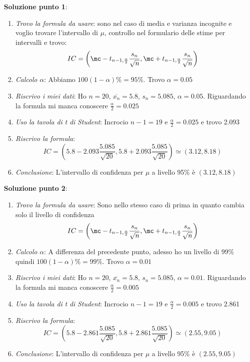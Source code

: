 \ind \textbf{Soluzione punto 1}: 
\begin{enumerate}
    \item \textit{Trovo la formula da usare}: sono nel caso di media e varianza incognite e voglio trovare l'intervallo di $\mu$, controllo nel formulario delle stime per intervalli e trovo: $$ IC = \left( \mc - t_{n-1,\frac{\alpha}{2}} \dfrac{s_n}{\sqrt{n}}, \mc + t_{n-1,\frac{\alpha}{2}} \dfrac{s_n}{\sqrt{n}}\right) $$
    \item \textit{Calcolo $\alpha$}: Abbiamo $100(1 - \alpha)\% = 95\%$. Trovo $\alpha=0.05$
    \item \textit{Riscrivo i miei dati}: Ho $n=20$, $\overline{x_n}=5.8$, $s_n=5.085$, $\alpha=0.05$. Riguardando la formula mi manca conoscere $\frac{\alpha}{2}=0.025$
    \item \textit{Uso la tavola di t di Student}: Incrocio $n-1=19$ e $\frac{\alpha}{2}=0.025$ e trovo 2.093
    \item \textit{Riscrivo la formula}: $$IC = \left( 5.8 - 2.093 \frac{5.085}{\sqrt{20}}, 5.8 + 2.093 \frac{5.085}{\sqrt{20}} \right) \simeq (3.12 , 8.18)$$
    \item \textit{Conclusione}: L'intervallo di confidenza per $\mu$ a livello 95\% è $(3.12 , 8.18)$ 
\end{enumerate}

\ind \textbf{Soluzione punto 2}: 
\begin{enumerate}
    \item \textit{Trovo la formula da usare}: Sono nello stesso caso di prima in quanto cambia solo il livello di confidenza $$ IC = \left( \mc - t_{n-1,\frac{\alpha}{2}} \dfrac{s_n}{\sqrt{n}}, \mc + t_{n-1,\frac{\alpha}{2}} \dfrac{s_n}{\sqrt{n}}\right) $$
    \item \textit{Calcolo $\alpha$}: A differenza del precedente punto, adesso ho un livello di 99\% quindi $100(1 - \alpha)\% = 99\%$. Trovo $\alpha=0.01$
    \item \textit{Riscrivo i miei dati}: Ho $n=20$, $\overline{x_n}=5.8$, $s_n=5.085$, $\alpha=0.01$. Riguardando la formula mi manca conoscere $\frac{\alpha}{2}=0.005$
    \item \textit{Uso la tavola di t di Student}: Incrocio $n-1=19$ e $\frac{\alpha}{2}=0.005$ e trovo 2.861
    \item \textit{Riscrivo la formula}: $$IC = \left( 5.8 - 2.861 \frac{5.085}{\sqrt{20}}, 5.8 + 2.861 \frac{5.085}{\sqrt{20}} \right) \simeq (2.55 , 9.05)$$
    \item \textit{Conclusione}: L'intervallo di confidenza per $\mu$ a livello 95\% è $(2.55 , 9.05)$
\end{enumerate}


